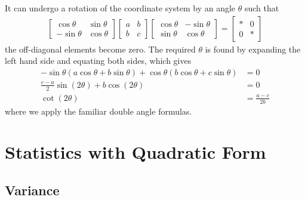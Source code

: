 It can undergo a rotation of the coordinate system by an angle $\theta$ such that
\begin{align*}
\begin{bmatrix}
\cos \theta & \sin \theta \\
-\sin \theta & \cos \theta
\end{bmatrix}
\begin{bmatrix}
a & b \\
b & c
\end{bmatrix}
\begin{bmatrix}
\cos \theta & -\sin \theta \\
\sin \theta & \cos \theta
\end{bmatrix}
=
\begin{bmatrix}
* & 0\\
0 & *
\end{bmatrix}
\end{align*}
the off-diagonal elements become zero. The required $\theta$ is found by  expanding the left hand side and equating both sides, which gives
\begin{align*}
-\sin \theta (a \cos\theta + b\sin \theta) + \cos\theta (b \cos \theta + c\sin \theta) &= 0 \\
\frac{c-a}{2} \sin (2\theta) + b\cos(2\theta) &= 0 \\
\cot(2\theta) &= \frac{a-c}{2b}
\end{align*}
where we apply the familiar double angle formulas.

\section{Statistics with Quadratic Form}
\subsection{Variance}
\label{variancesec}
